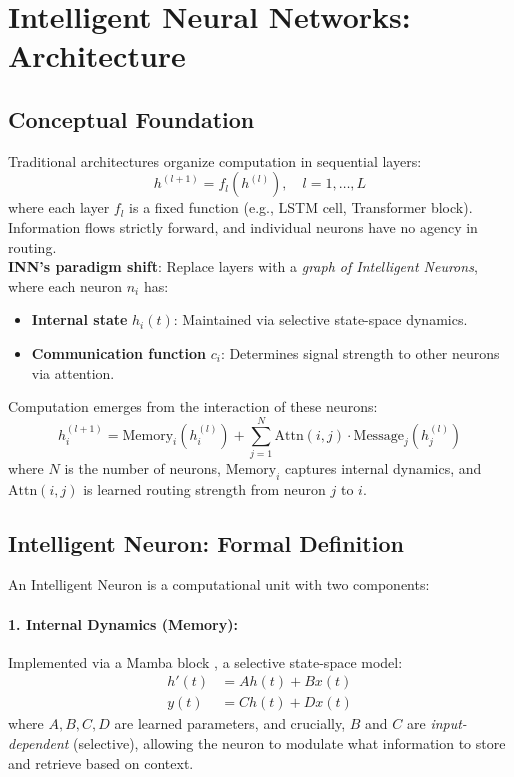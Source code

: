 \documentclass{article}
\begin{document}
\section{Intelligent Neural Networks: Architecture}

\subsection{Conceptual Foundation}

Traditional architectures organize computation in sequential layers:
\begin{equation}
h^{(l+1)} = f_l(h^{(l)}), \quad l = 1, \ldots, L
\end{equation}
where each layer $f_l$ is a fixed function (e.g., LSTM cell, Transformer block). Information flows strictly forward, and individual neurons have no agency in routing.
\\
\textbf{INN's paradigm shift}: Replace layers with a \emph{graph of Intelligent Neurons}, where each neuron $n_i$ has:
\begin{itemize}
    \item \textbf{Internal state} $h_i(t)$: Maintained via selective state-space dynamics.
    \item \textbf{Communication function} $c_i$: Determines signal strength to other neurons via attention.
\end{itemize}

Computation emerges from the interaction of these neurons:
\begin{equation}
h_i^{(l+1)} = \text{Memory}_i(h_i^{(l)}) + \sum_{j=1}^{N} \text{Attn}(i, j) \cdot \text{Message}_j(h_j^{(l)})
\end{equation}
where $N$ is the number of neurons, $\text{Memory}_i$ captures internal dynamics, and $\text{Attn}(i,j)$ is learned routing strength from neuron $j$ to $i$.

\subsection{Intelligent Neuron: Formal Definition}

An Intelligent Neuron is a computational unit with two components:

\paragraph{1. Internal Dynamics (Memory):} Implemented via a Mamba block \cite{gu2023mamba}, a selective state-space model:
\begin{align}
h'(t) &= A h(t) + B x(t) \\
y(t) &= C h(t) + D x(t)
\end{align}
where $A, B, C, D$ are learned parameters, and crucially, $B$ and $C$ are \emph{input-dependent} (selective), allowing the neuron to modulate what information to store and retrieve based on context.
\end{document}
